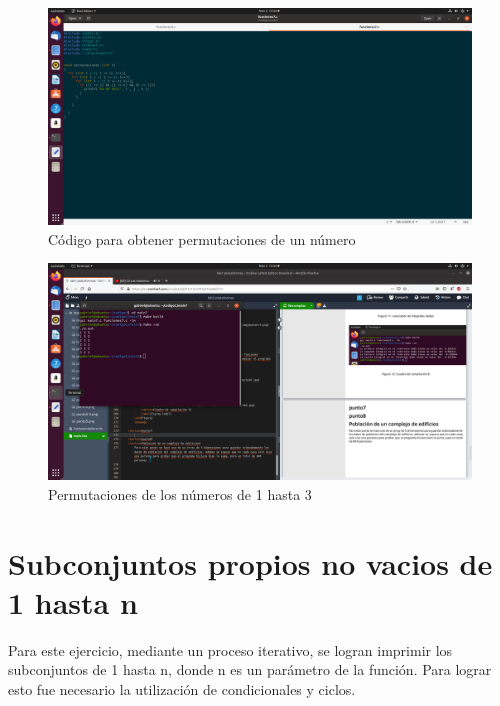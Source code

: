 \documentclass[
  letterpaper, 
  maincolor=black,
  sectioncolor=black!90,
  subsectioncolor=black!70,
  itemtextcolor=black!40,
]{fortysecondscv}
\begin{document}
        \begin{figure}[H]
            \centering
            \includegraphics[trim= 50 480 980 50,clip,width=1.20\textwidth]{img/punto7.png}
            \caption{Código para obtener permutaciones de un número}
            \label{fig:my_label}
        \end{figure}\begin{figure}[H]
            \centering
            \includegraphics[trim= 135 500 980 150,clip,width=1.20\textwidth]{img/punto7-7.png}
            \caption{Permutaciones de los números de 1 hasta 3}
            \label{fig:my_label}
        \end{figure}
        \newpage
        
    \section{Subconjuntos propios no vacios de 1 hasta n}
        Para este ejercicio, mediante un proceso iterativo, se logran imprimir los subconjuntos de 1 hasta n, donde n es un parámetro de la función. Para lograr esto fue necesario la utilización de condicionales y ciclos.
    
\end{document}
